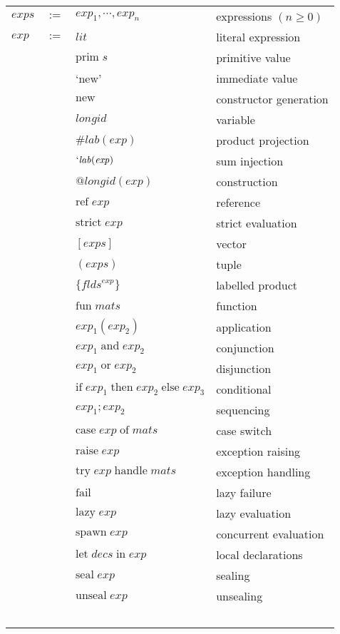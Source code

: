 \documentclass[twoside]{article}
\newcommand{\x}[1]{\mathit{#1}}
\newcommand{\f}[1]{\mbox{#1}}
\newcommand{\lab}{\x{lab}}
\newcommand{\longid}{\x{longid}}
\newcommand{\lit}{\x{lit}}
\renewcommand{\exp}{\x{exp}}
\newcommand{\exps}{\x{exps}}
\newcommand{\flds}{\x{flds}}
\newcommand{\mats}{\x{mats}}
\newcommand{\decs}{\x{decs}}
\begin{document}
\begin{center}
\begin{tabular}{lcll}

$\exps$	&$:=$&	$\exp_1,\cdots,\exp_n$		& expressions $(n\geq0)$ \\
$\exp$	&$:=$&	$\lit$				& literal expression \\
	&&	$\f{prim}\;\x{s}$		& primitive value \\
	&&	`$\f{new}$'			& immediate value \\
	&&	$\f{new}$			& constructor generation \\
	&&	$\longid$			& variable \\
	&&	$\#\lab(\exp)$			& product projection \\
	&&	$`\lab(\exp)$			& sum injection \\
	&&	$@\longid(\exp)$		& construction \\
	&&	$\f{ref}\;\exp$			& reference \\
	&&	$\f{strict}\;\exp$		& strict evaluation \\
	&&	$[\exps]$			& vector \\
	&&	$(\exps)$			& tuple \\
	&&	$\{\flds^\exp\}$		& labelled product \\
	&&	$\f{fun}\;\mats$		& function \\
	&&	$\exp_1(\exp_2)$		& application \\
	&&	$\exp_1\;\f{and}\;\exp_2$	& conjunction \\
	&&	$\exp_1\;\f{or}\;\exp_2$	& disjunction \\
	&&	$\f{if}\;\exp_1\;\f{then}\;\exp_2\;\f{else}\;\exp_3$
						& conditional \\
	&&	$\exp_1;\exp_2$			& sequencing \\
	&&	$\f{case}\;\exp\;\f{of}\;\mats$ & case switch \\
	&&	$\f{raise}\;\exp$		& exception raising \\
	&&	$\f{try}\;\exp\;\f{handle}\;\mats$ & exception handling \\
	&&	$\f{fail}$			& lazy failure \\
	&&	$\f{lazy}\;\exp$		& lazy evaluation \\
	&&	$\f{spawn}\;\exp$		& concurrent evaluation \\
	&&	$\f{let}\;\decs\;\f{in}\;\exp$	& local declarations \\
	&&	$\f{seal}\;\exp$		& sealing \\
	&&	$\f{unseal}\;\exp$		& unsealing \\
\ \\


\end{tabular}
\end{center}
\end{document}
